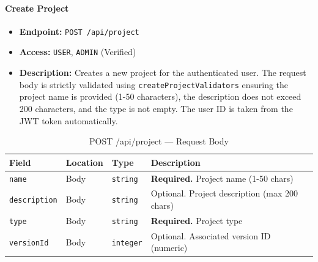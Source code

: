 \paragraph{Create Project}
\label{subsubsec:create-project}

\begin{itemize}
  \item \textbf{Endpoint:} \texttt{POST /api/project}
  \item \textbf{Access:} \texttt{USER}, \texttt{ADMIN} (Verified)
  \item \textbf{Description:} Creates a new project for the authenticated user.
  The request body is strictly validated using \texttt{createProjectValidators} ensuring the project name is provided (1-50 characters), the description does not exceed 200 characters, and the type is not empty.
  The user ID is taken from the JWT token automatically.
\end{itemize}

\begin{table}[H]
\centering
\renewcommand{\arraystretch}{1.3}
\begin{tabularx}{\textwidth}{|l|l|l|X|}
\hline
\textbf{Field} & \textbf{Location} & \textbf{Type} & \textbf{Description} \\
\hline
\texttt{name}        & Body & \texttt{string}  & \textbf{Required.} Project name (1-50 chars) \\
\hline
\texttt{description} & Body & \texttt{string}  & Optional. Project description (max 200 chars) \\
\hline
\texttt{type}        & Body & \texttt{string}  & \textbf{Required.} Project type \\
\hline
\texttt{versionId}   & Body & \texttt{integer} & Optional. Associated version ID (numeric) \\
\hline
\end{tabularx}
\caption{POST /api/project — Request Body}
\label{tab:create-project-body}
\end{table}


